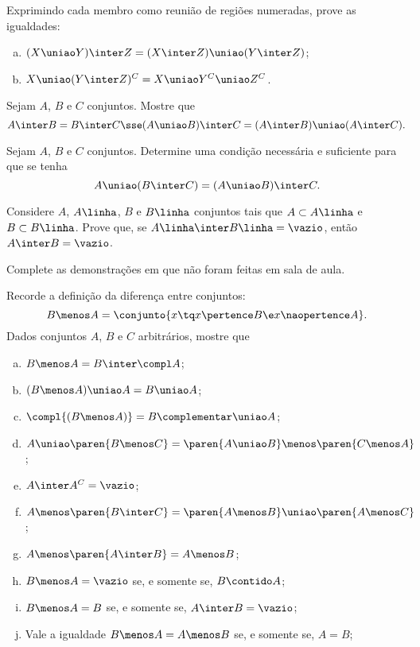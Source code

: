 \begin{exercise}
  Exprimindo cada membro como reunião de regiões numeradas, prove as igualdades:
  \begin{enumerate}[a)]
    \item $(X \uniao Y) \inter Z = (X \inter Z) \uniao (Y \inter Z)$;
    \item $X \uniao (Y \inter Z )^C = X \uniao Y^C \uniao Z^C$.
  \end{enumerate}
\end{exercise}

\begin{exercise}
  Sejam $A$, $B$ e $C$ conjuntos. Mostre que 
  $$A \inter B = B \inter C \sse (A \uniao B) \inter C =(A \inter B) \uniao (A \inter C). $$
\end{exercise}

\begin{exercise}
  Sejam $A$, $B$ e $C$ conjuntos. Determine uma condição necessária e suficiente para que se tenha 
  \[
    A \uniao (B \inter C) = (A \uniao B) \inter C.
  \]
\end{exercise}

\begin{exercise}
  Considere $A$, $A\linha$, $B$ e $B\linha$ conjuntos tais que $A  \subset A\linha$ e 
  $B \subset B\linha$. Prove que, se $A\linha \inter B\linha=\vazio$, então
  $A\inter B = \vazio$.  
\end{exercise}

\begin{exercise}
  Complete as demonstrações em  que não foram feitas em sala de aula.
\end{exercise}

\begin{exercise}
  Recorde a definição da diferença entre conjuntos:
  \[
    B \menos A = \conjunto{ x \tq x \pertence B \e x \naopertence A}.
  \]
  Dados conjuntos $A$, $B$ e $C$ arbitrários, mostre que
  \begin{enumerate}[a)]
    \item $B \menos A = B \inter \compl A$;
    \item $(B \menos A) \uniao A = B \uniao A$;
    \item $\compl{(B \menos A)} = B\complementar \uniao A$;
    \item $A \uniao \paren{ B \menos C } = \paren{A \uniao B } \menos \paren{C \menos A }$;
    \item $A \inter A^C = \vazio$;
    \item $A \menos \paren{B \inter C } = \paren{A \menos B } \uniao \paren{A \menos C }$;
    \item $A \menos \paren{ A \inter B } = A \menos B$;
    \item $B \menos A = \vazio$ se, e somente se, $B \contido A$;
    \item $B \menos A = B$ se, e somente se, $A \inter B = \vazio$;
    \item Vale a igualdade $B \menos A = A \menos B$ se, e somente se, $A = B$;
  \end{enumerate}
\end{exercise}

